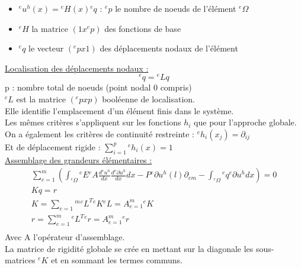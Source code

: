 \documentclass[../main.tex]{subfiles}
\begin{document}
\begin{itemize}
    \item ${}^eu^h(x) = {}^eH(x) {}^eq$ : ${}^ep$ le nombre de noeuds de l'élément ${}^e\Omega$\\
    \item ${}^eH$ la matrice $(1x {}^ep)$ des fonctions de base\\
    \item ${}^eq$ le vecteur $({}^epx1)$ des déplacements nodaux de l'élément 
\end{itemize}

\quad \underline{Localisation des déplacements nodaux :}\\
\begin{equation}
    {}^eq = {}^eLq
\end{equation}
p : nombre total de noeuds (point nodal 0 compris)\\
${}^eL$ est la matrice $({}^epxp)$ booléenne de localisation.\\
Elle identifie l'emplacement d'un élément finis dans le système.\\

Les mêmes critères s'appliquent sur les fonctions $h_i$ que pour l'approche globale.\\

On a également les critères de continuité restreinte : ${}^eh_i(x_j) = \partial_{ij}$\\
Et de déplacement rigide : $\sum_{i=1}^p {}^eh_i(x)=1$\\

\quad \underline{Assemblage des grandeurs élémentaires :}\\
\begin{equation}
\begin{gathered}
    \sum_{e=1}^m ( \int_{{}^e\Omega} {}^eE {}^eA \frac{d {}^eu^h}{dx} \frac{d {}^e\partial u^h}{dx}dx - P {}^e\partial u^h(l) \partial_{em} - \int_{{}^e\Omega} {}^eq {}^e\partial u^hdx) = 0\\
    Kq = r\\
    K = \sum_{e=1}{}^m {}^eL^T {}^eK {}^eL = A_{e=1}^m {}^eK\\
    r = \sum_{e=1}^m {}^eL^T {}^er = A_{e=1}^m {}^er\\
\end{gathered}
\end{equation}
Avec A l'opérateur d'assemblage.\\

La matrice de rigidité globale se crée en mettant sur la diagonale les sous-matrices ${}^eK$ et en sommant les termes communs.\\
\end{document}
